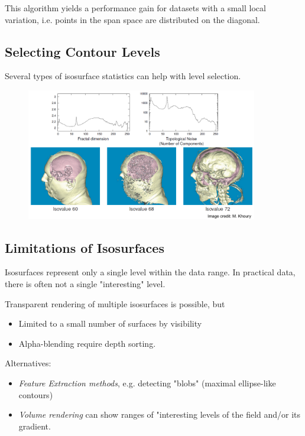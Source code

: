 This algorithm yields a performance gain for datasets with a small local variation, i.e. points in the span space are distributed on the diagonal.

\subsection{Selecting Contour Levels}
Several types of isosurface statistics can help with level selection. 
\begin{figure}[H]
\centering
\includegraphics[width=0.9\textwidth]{img/02_contouring_statistics}
\end{figure}

\subsection{Limitations of Isosurfaces}
Isosurfaces represent only a single level within the data range. In practical data, there is often not a single "interesting" level.

Transparent rendering of multiple isosurfaces is possible, but
\begin{itemize}
    \item Limited to a small number of surfaces by visibility
    \item Alpha-blending require depth sorting.
\end{itemize}

Alternatives:
\begin{itemize}
    \item \emph{Feature Extraction methods}, e.g. detecting "blobs" (maximal ellipse-like contours)
    \item \emph{Volume rendering} can show ranges of "interesting levels of the field and/or its gradient.
\end{itemize}







